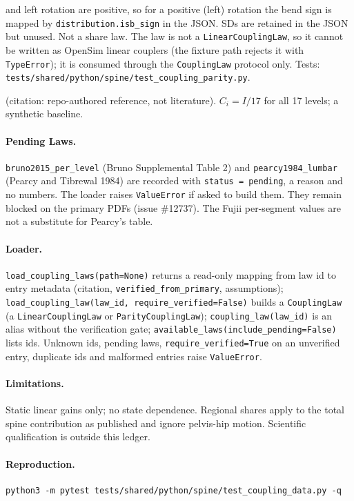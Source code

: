 \begin{description}
  and left rotation are positive, so for a positive (left) rotation the bend
  sign is mapped by \texttt{distribution.isb\_sign} in the JSON. SDs are
  retained in the JSON but unused. Not a share law. The law is not a
  \texttt{LinearCouplingLaw}, so it cannot be written as OpenSim linear
  couplers (the fixture path rejects it with \texttt{TypeError}); it is
  consumed through the \texttt{CouplingLaw} protocol only.
  Tests: \texttt{tests/shared/python/spine/test\_coupling\_parity.py}.
\item[\texttt{uniform\_reference}] (citation: repo-authored reference, not
  literature). $C_i=I/17$ for all 17 levels; a synthetic baseline.
\end{description}

\paragraph{Pending Laws.}
\texttt{bruno2015\_per\_level} (Bruno Supplemental Table 2) and
\texttt{pearcy1984\_lumbar} (Pearcy and Tibrewal 1984) are recorded with
\texttt{status = pending}, a reason and no numbers. The loader raises
\texttt{ValueError} if asked to build them. They remain blocked on the primary
PDFs (issue \#12737). The Fujii per-segment values are not a substitute for
Pearcy's table.

\paragraph{Loader.}
\texttt{load\_coupling\_laws(path=None)} returns a read-only mapping from law
id to entry metadata (citation, \texttt{verified\_from\_primary}, assumptions);
\texttt{load\_coupling\_law(law\_id, require\_verified=False)} builds a
\texttt{CouplingLaw} (a \texttt{LinearCouplingLaw} or \texttt{ParityCouplingLaw});
\texttt{coupling\_law(law\_id)} is an alias without the verification gate;
\texttt{available\_laws(include\_pending=False)} lists ids. Unknown ids, pending
laws, \texttt{require\_verified=True} on an unverified entry, duplicate ids and
malformed entries raise \texttt{ValueError}.

\paragraph{Limitations.}
Static linear gains only; no state dependence. Regional shares apply to the
total spine contribution as published and ignore pelvis-hip motion. Scientific
qualification is outside this ledger.

\paragraph{Reproduction.}
\begin{verbatim}
python3 -m pytest tests/shared/python/spine/test_coupling_data.py -q
\end{verbatim}
